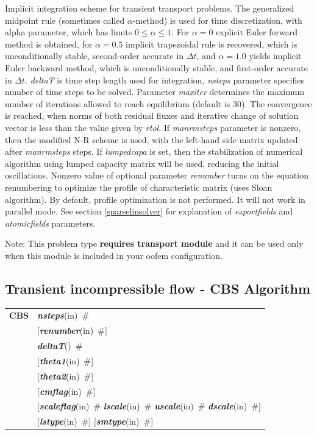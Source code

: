 \documentclass[a4paper]{article}
\makeatletter
\newcommand{\param}[1]{{\em #1}}
\newcommand{\keywordnotype}[1]{\mbox{{\it{\bf{#1}}}}}
\newcommand{\keyword}[2]{\mbox{{\keywordnotype{#1}\tiny (#2)}}}
\newcommand{\entKeywordInst}[1]{\mbox{{\bf{{#1}}}}}
\newcommand{\field}[2]{\mbox{\keyword{#1}{#2}~\#}}
\newcommand{\optField}[2]{\mbox{[\field{#1}{#2}]}}
\newenvironment{record}[1][]{\begin{tabular}{|ll}}{\end{tabular}\\}
\newcommand{\recentry}[2]{{#1}&{#2}\\}
\newcounter{rcc}
\newenvironment{record}[1][\textwidth]{\setcounter{rcc}{0}\begin{tabular*}{#1}{|ll@{\extracolsep{\fill}}r}}{\end{tabular*}\\}
\newcommand{\recentry}[2]{\ifthenelse{\value{rcc}>0}{&$\backslash$ \\}{\setcounter{rcc}{1}}{#1}&{#2}}
\makeatother
\begin{document}
Implicit
integration scheme for transient transport problems. The generalized
midpoint rule (sometimes called $\alpha$-method) is used for time discretization, with alpha parameter,
which has limits $0\le\alpha\le1$. For $\alpha=0$ explicit Euler
forward method is obtained, for $\alpha=0.5$ implicit trapezoidal rule
is recovered, which is unconditionally stable, second-order accurate
in $\Delta t$, and $\alpha=1.0$ yields implicit Euler backward method,
which is unconditionally stable, and first-order accurate
in $\Delta t$. \param{deltaT} is time step length used for
integration, \param{nsteps} parameter specifies
number of time steps to be solved. Parameter \param{maxiter} determines the maximum
number of iterations allowed to reach equilibrium (default is 30).
The convergence is reached, when norms of both residual fluxes and iterative
change of solution vector is less than the value given by \param{rtol}.
If \param{manrmsteps} parameter is nonzero, then the modified
N-R scheme is used, with the left-hand side matrix updated after
\param{manrmsteps} steps.
If \param{lumpedcapa} is set, then the stabilization of numerical
algorithm using lumped capacity matrix will be used, reducing the
initial oscillations.
Nonzero value of optional parameter \param{renumber} turns on the
equation renumbering to optimize the profile of characteristic matrix
(uses Sloan algorithm). By default, profile optimization is not
performed. It will not work in parallel mode.
See section \ref{sparselinsolver} for explanation of
\param{exportfields} and \param{atomicfields} parameters.

Note: This problem type {\bf requires transport module} and it
can be used only when this module is included in your oofem
configuration.

\subsection{Transient incompressible flow - CBS Algorithm}
\label{cbsIncomp}
\begin{record}
\recentry{\entKeywordInst{CBS}}{\field{nsteps}{in}}
\recentry{}{\optField{renumber}{in}}
\recentry{}{\field{deltaT}{}} \recentry{}{\optField{theta1}{in}} \recentry{}{\optField{theta2}{in}}
\recentry{}{\optField{cmflag}{in}}
\recentry{}{[\field{scaleflag}{in} \field{lscale}{in} \field{uscale}{in} \field{dscale}{in}]}
\recentry{}{\optField{lstype}{in} \optField{smtype}{in}}
\end{record}
\end{document}
